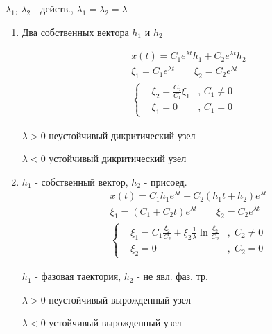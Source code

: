 \documentclass{article}
\begin{document}
\hr
  $\lambda_1$, $\lambda_2$ - действ., $\lambda_1=\lambda_2=\lambda$
    \begin{enumerate}
      \item Два собственных вектора $h_1$ и $h_2$
         
        \begin{gather*}
          x(t)=C_1 e^{\lambda t} h_1 + C_2 e^{\lambda t} h_2 \\ 
          \xi_1 = C_1 e^{\lambda t} \qquad \xi_2 = C_2 e^{\lambda t} \\ 
          \left\{\begin{aligned}
            & \xi_2 = \frac{C_2}{C_1}\xi_1 &,\, C_1 \neq0 \\ 
            & \xi_1=0 &,\, C_1 = 0
          \end{aligned}\right. 
        \end{gather*}


        $\lambda>0$ неустойчивый дикритический узел

        $\lambda<0$ устойчивый дикритический узел
        \item $h_1$ - собственный вектор, $h_2$ - присоед.
          \begin{gather*}
          x(t)=C_1 h_1 e^{\lambda t} + C_2(h_1 t+h_2)e^{\lambda t} \\ 
          \xi_1 = (C_1+C_2 t) e^{\lambda t} \qquad \xi_2 = C_2 e^{\lambda t} \\ 
          \left\{\begin{aligned}
            & \xi_1=C_1\frac{\xi_2}{C_2}+\xi_2\frac{1}{\lambda}\ln \frac{\xi_2}{C_2} &, \; C_2 \neq 0 \\ 
            & \xi_2=0 &, \; C_2=0
          \end{aligned}\right.
        \end{gather*}

        $h_1$ - фазовая таектория, $h_2$ - не явл. фаз. тр.

        $\lambda>0$ неустойчивый вырожденный узел 

        $\lambda<0$ устойчивый вырожденный узел 
    \end{enumerate}
\end{document}
